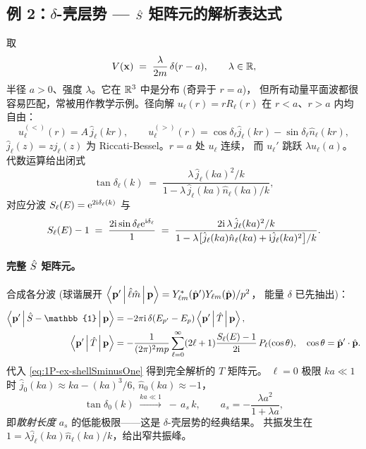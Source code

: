 \subsection{例 2：$\delta$-壳层势 — $\hat{S}$ 矩阵元的解析表达式}
\label{ssec:1P-ex-shell}

取
\begin{equation}
  V(\mathbf{x}) \;=\; \frac{\lambda}{2m}\,\delta(r-a),\qquad \lambda\in\mathbb{R},
  \label{eq:1P-ex-shellV}
\end{equation}
半径 $a>0$、强度 $\lambda$。它在 $\mathbb{R}^3$ 中是分布 (奇异于 $r=a$)，
但所有动量平面波都很容易匹配，常被用作教学示例。径向解
$u_\ell(r)=rR_\ell(r)$ 在 $r<a$、$r>a$ 内均自由：
\begin{equation}
  u_\ell^{(<)}(r) = A\,\hat j_\ell(kr),\qquad
  u_\ell^{(>)}(r) = \cos\delta_\ell \hat j_\ell(kr) - \sin\delta_\ell \hat n_\ell(kr),
  \label{eq:1P-ex-shellRad}
\end{equation}
$\hat j_\ell(z)=z j_\ell(z)$ 为 Riccati-Bessel。$r=a$ 处 $u_\ell$ 连续，
而 $u_\ell'$ 跳跃 $\lambda u_\ell(a)$。代数运算给出闭式
\begin{equation}
  \tan\delta_\ell(k) \;=\;
   \frac{\lambda\,\hat j_\ell(ka)^2 / k}
        {1 - \lambda\,\hat j_\ell(ka)\hat n_\ell(ka)/k},
  \label{eq:1P-ex-shellDelta}
\end{equation}
对应分波 $S_\ell(E) = \mathrm{e}^{2\mathrm{i}\delta_\ell(k)}$ 与
\begin{equation}
  S_\ell(E) - 1 \;=\;
   \frac{2\mathrm{i}\sin\delta_\ell\mathrm{e}^{\mathrm{i}\delta_\ell}}{1}
   \;=\; \frac{2\mathrm{i}\,\lambda\,\hat j_\ell(ka)^2/k}
              {1 - \lambda\bigl[\hat j_\ell(ka)\hat n_\ell(ka)
                              +\mathrm{i}\hat j_\ell(ka)^2\bigr]/k}.
  \label{eq:1P-ex-shellSminusOne}
\end{equation}

\paragraph{完整 $\hat{S}$ 矩阵元。}
合成各分波 (球谐展开 $\left\langle \mathbf{p}' \,\middle|\, \hat\ell\hat m \,\middle|\, \mathbf{p} \right\rangle
=Y_{\ell m}^*(\hat{\mathbf{p}}')Y_{\ell m}(\hat{\mathbf{p}})/p^2$，
能量 $\delta$ 已先抽出)：
\begin{align}
  \matel{\mathbf{p}'}{\Smat-\mathbb{1}}{\mathbf{p}}
  &= -2\pi\rmi\,\delta(E_{p'}-E_p)\matel{\mathbf{p}'}{\Tmat}{\mathbf{p}},\nonumber\\
  \matel{\mathbf{p}'}{\Tmat}{\mathbf{p}}
  &= -\frac{1}{(2\pi)^2 m p}\sum_{\ell=0}^{\infty}(2\ell+1)
     \frac{S_\ell(E)-1}{2\rmi}\,P_\ell(\cos\theta),\quad
   \cos\theta=\hat{\mathbf{p}}'\cdot\hat{\mathbf{p}}.
  \label{eq:1P-ex-shellTfull}
\end{align}
代入 \eqref{eq:1P-ex-shellSminusOne} 得到完全解析的 $T$ 矩阵元。
$\ell=0$ 极限 $ka\ll 1$ 时
$\hat j_0(ka)\approx ka-(ka)^3/6$, $\hat n_0(ka)\approx -1$，
\begin{equation}
  \tan\delta_0(k) \;\xrightarrow{ka\ll 1}\; -\,a_s\,k,\qquad
  a_s = -\frac{\lambda a^2}{1+\lambda a},
  \label{eq:1P-ex-shellScattLength}
\end{equation}
即\emph{散射长度} $a_s$ 的低能极限——这是 $\delta$-壳层势的经典结果。
共振发生在 $1=\lambda \hat j_\ell(ka)\hat n_\ell(ka)/k$，给出窄共振峰。

